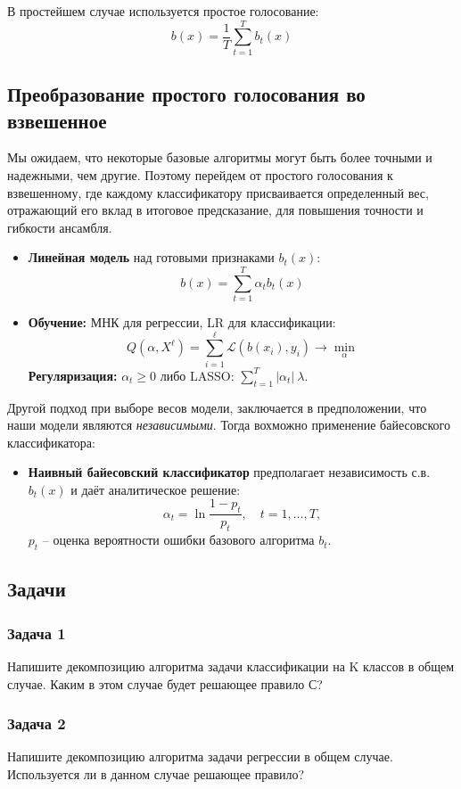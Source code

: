 В простейшем случае используется простое голосование:
$$b(x) = \frac{1}{T} \sum_{t=1}^T  b_t(x)$$

\subsection*{Преобразование простого голосования во взвешенное}
Мы ожидаем, что некоторые базовые алгоритмы могут быть более точными и надежными, чем другие. Поэтому перейдем от простого голосования к взвешенному, где каждому классификатору присваивается определенный вес, отражающий его вклад в итоговое предсказание, для повышения точности и гибкости ансамбля.
\begin{itemize}
    \item \textbf{Линейная модель} над готовыми признаками $b_t(x)$:
          $$b(x) = \sum_{t=1}^T \alpha_t b_t(x)$$
    \item \textbf{Обучение:} МНК для регрессии, LR для классификации:
          $$Q(\alpha, X^\ell) = \sum_{i=1}^\ell \mathcal{L}(b(x_i), y_i) \to \min_\alpha$$
          \textbf{Регуляризация:} $\alpha_t \ge 0$ либо LASSO: $\sum_{t=1}^T |\alpha_t| \
              \lambda$.
\end{itemize}
Другой подход при выборе весов модели, заключается в предположении, что наши модели являются \textit{независимыми}. Тогда вохможно применение байесовского классификатора:
\begin{itemize}
    \item \textbf{Наивный байесовский классификатор} предполагает независимость с.в. $b_t(x)$ и даёт аналитическое решение:
          $$\alpha_t = \ln \frac{1 - p_t}{p_t}, \quad t = 1, \dots, T,$$
          $p_t$ – оценка вероятности ошибки базового алгоритма $b_t$.
\end{itemize}




\subsection*{Задачи}
\subsubsection*{Задача 1}
Напишите декомпозицию алгоритма задачи классификации на K классов в общем случае. Каким в этом случае будет решающее правило С?
\subsubsection*{Задача 2}
Напишите декомпозицию алгоритма задачи регрессии в общем случае. Используется ли в данном случае решающее правило?

